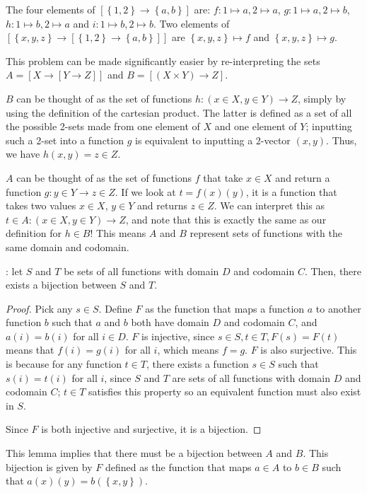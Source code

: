 
\usepackage{hyperref}


The four elements of $\left[ \left\{ 1, 2 \right\} \rightarrow \left\{ a, b \right\} \right]$ are: $f: 1 \mapsto a, 2 \mapsto a$, $g: 1 \mapsto a, 2 \mapsto b$, $h: 1 \mapsto b, 2 \mapsto a$ and $i: 1 \mapsto b, 2 \mapsto b$. Two elements of $\left[ \left\{ x, y, z \right\} \rightarrow \left[ \left\{ 1, 2 \right\} \rightarrow \left\{ a, b \right\} \right] \right]$ are $\left\{ x, y, z \right\} \mapsto f$ and $\left\{ x, y, z \right\} \mapsto g$.

This problem can be made significantly easier by re-interpreting the sets $A = \left[X \rightarrow \left[Y \rightarrow Z\right]\right]$ and $B = \left[(X \times Y) \rightarrow Z\right]$.

$B$ can be thought of as the set of functions $h: (x \in X, y \in Y) \rightarrow Z$, simply by using the definition of the cartesian product. The latter is defined as a set of all the possible 2-sets made from one element of $X$ and one element of $Y$; inputting such a 2-set into a function $g$ is equivalent to inputting a 2-vector $(x, y)$. Thus, we have $h(x, y) = z \in Z$.

$A$ can be thought of as the set of functions $f$ that take $x \in X$ and return a function $g: y \in Y \rightarrow z \in Z$. If we look at $t = f(x)(y)$, it is a function that takes two values $x \in X$, $y \in Y$ and returns $z \in Z$. We can interpret this as $t \in A: (x \in X, y \in Y) \rightarrow Z$, and note that this is exactly the same as our definition for $h \in B$! This means $A$ and $B$ represent sets of functions with the same domain and codomain.

\lemma: let $S$ and $T$ be sets of all functions with domain $D$ and codomain $C$. Then, there exists a bijection between $S$ and $T$.

\begin{proof}
Pick any $s \in S$. Define $F$ as the function that maps a function $a$ to another function $b$ such that $a$ and $b$ both have domain $D$ and codomain $C$, and $a(i) = b(i)$ for all $i \in D$. $F$ is injective, since $s \in S, t \in T, F(s) = F(t)$ means that $f(i) = g(i)$ for all $i$, which means $f = g$. $F$ is also surjective. This is because for any function $t \in T$, there exists a function $s \in S$ such that $s(i) = t(i)$ for all $i$, since $S$ and $T$ are sets of all functions with domain $D$ and codomain $C$; $t \in T$ satisfies this property so an equivalent function must also exist in $S$.

Since $F$ is both injective and surjective, it is a bijection.
\end{proof}
\bigskip
This lemma implies that there must be a bijection between $A$ and $B$. This bijection is given by $F$ defined as the function that maps $a \in A$ to $b \in B$ such that $a(x)(y) = b(\left\{ x, y \right\})$.

